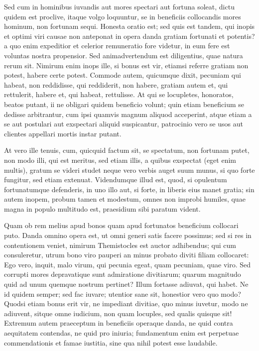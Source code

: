  Sed cum in hominibus iuvandis aut mores spectari aut fortuna soleat, dictu quidem est proclive, itaque volgo loquuntur, se in beneficiis collocandis mores hominum, non fortunam sequi. Honesta oratio est; sed quis est tandem, qui inopis et optimi viri causae non anteponat in opera danda gratiam fortunati et potentis? a quo enim expeditior et celerior remuneratio fore videtur, in eum fere est voluntas nostra propensior. Sed animadvertendum est diligentius, quae natura rerum sit. Nimirum enim inops ille, si bonus est vir, etiamsi referre gratiam non potest, habere certe potest. Commode autem, quicumque dixit, pecuniam qui habeat, non reddidisse, qui reddiderit, non habere, gratiam autem et, qui rettulerit, habere et, qui habeat, rettulisse. At qui se locupletes, honoratos, beatos putant, ii ne obligari quidem beneficio volunt; quin etiam beneficium se dedisse arbitrantur, cum ipsi quamvis magnum aliquod acceperint, atque etiam a se aut postulari aut exspectari aliquid suspicantur, patrocinio vero se usos aut clientes appellari mortis instar putant.

 At vero ille tenuis, cum, quicquid factum sit, se spectatum, non fortunam putet, non modo illi, qui est meritus, sed etiam illis, a quibus exspectat (eget enim multis), gratum se videri studet neque vero verbis auget suum munus, si quo forte fungitur, sed etiam extenuat. Videndumque illud est, quod, si opulentum fortunatumque defenderis, in uno illo aut, si forte, in liberis eius manet gratia; sin autem inopem, probum tamen et modestum, omnes non improbi humiles, quae magna in populo multitudo est, praesidium sibi paratum vident.

 Quam ob rem melius apud bonos quam apud fortunatos beneficium collocari puto. Danda omnino opera est, ut omni generi satis facere possimus; sed si res in contentionem veniet, nimirum Themistocles est auctor adhibendus; qui cum consuleretur, utrum bono viro pauperi an minus probato diviti filiam collocaret: Ego vero, inquit, malo virum, qui pecunia egeat, quam pecuniam, quae viro. Sed corrupti mores depravatique sunt admiratione divitiarum; quarum magnitudo quid ad unum quemque nostrum pertinet? Illum fortasse adiuvat, qui habet. Ne id quidem semper; sed fac iuvare; utentior sane sit, honestior vero quo modo? Quodsi etiam bonus erit vir, ne impediant divitiae, quo minus iuvetur, modo ne adiuvent, sitque omne iudicium, non quam locuples, sed qualis quisque sit! Extremum autem praeceptum in beneficiis operaque danda, ne quid contra aequitatem contendas, ne quid pro iniuria; fundamentum enim est perpetuae commendationis et famae iustitia, sine qua nihil potest esse laudabile.

